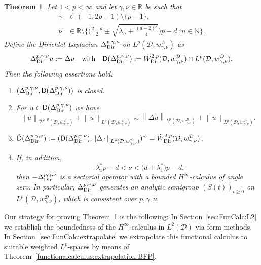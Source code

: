\documentclass[12pt,a4paper, reqno]{amsart}
\theoremstyle{plain}
\newtheorem{theorem}{Theorem}[section]
\theoremstyle{definition}
\theoremstyle{remark}
\numberwithin{equation}{section}
\newcommand{\1}{\mathbbm{1}}
\newcommand{\R}{\ensuremath{\mathbb{R}}}
\newcommand{\N}{\ensuremath{\mathbb{N}}}
\newcommand{\calD}{\ensuremath{\mathcal{D}}}
\newcommand{\sfD}{\ensuremath{\mathsf{D}}}
\newcommand{\Dir}{\textup{Dir}}
\newcommand{\nrm}[1]{\left\lVert #1 \right\rVert}
\begin{document}
\begin{theorem}\label{thm:Laplace:inhom}
Let  $1<p<\infty$ and let $\gamma,\nu\in\R$ be such that
\begin{equation}\label{eq:range:gamma-nu}\begin{aligned}
     \gamma&\in (-1,2p-1)\setminus\{p-1\},\\ \nu&\in\R\setminus\Big\{\Big(\tfrac{2+d}{2}\pm\sqrt{\lambda_n+\tfrac{(d-2)^2}{4}}\Big)p-d\,\colon n\in\N  \Big\}.
\end{aligned}
\end{equation}
Define the Dirichlet Laplacian $\Delta_\Dir^{p,\gamma,\nu}$ on $L^p(\calD,w_{\gamma,\nu}^\calD)$ as 
\[\Delta_\Dir^{p,\gamma,\nu}u:=\Delta u \quad \text{with}\quad \sfD(\Delta_\Dir^{p,\gamma,\nu}):=\Dot W^{2,p}_\Dir(\calD,w_{\gamma,\nu}^\calD)\cap L^p(\calD,w_{\gamma,\nu}^\calD).   \]
Then the following assertions hold.
\begin{enumerate}[\textup{(\roman*)}]
\item\label{it:Laplace:inhom:closed} $(\Delta_\Dir^{p,\gamma,\nu},\sfD(\Delta_\Dir^{p,\gamma,\nu}))$ is closed.
\item\label{it:Laplace:inhom:equivnrms} 
For $u\in \sfD(\Delta_\Dir^{p,\gamma,\nu})$ we have 
\[
\nrm{u}_{\Dot{W}^{2,p}(\calD,w_{\gamma,\nu}^\calD)}
+
\nrm{u}_{L^p(\calD,w_{\gamma,\nu}^\calD)}
\eqsim
\nrm{\Delta u}_{L^p(\calD,w_{\gamma,\nu}^\calD)} + \nrm{u}_{L^p(\calD,w_{\gamma,\nu}^\calD)}.
\]
\item\label{it:Laplace:hom:domain}  $\Dot{\sfD}(\Delta_\Dir^{p,\gamma,\nu}) := (\sfD(\Delta_\Dir^{p,\gamma,\nu}),\nrm{\Delta\,\cdot\,}_{L^p(\calD,w_{\gamma,\nu}^\calD)})^\sim=\Dot{W}^{2,p}_\Dir(\calD,w_{\gamma,\nu}^\calD)$. 
\item\label{it:Laplace:inhom:calculus}  If, in addition,
\begin{equation}\label{eq:range:calc:nu}
-\lambda_1^*p-d<\nu<\big(d+\lambda_1^*\big)p-d,    
\end{equation}
then $-\Delta_\Dir^{p,\gamma,\nu}$ is a sectorial operator with a bounded $H^\infty$-calculus of angle zero.
 In particular, $\Delta_\Dir^{p,\gamma,\nu}$ generates an analytic semigroup $(S(t))_{t\geq 0}$ on $L^p(\calD,w_{\gamma,\nu}^\calD)$, which is consistent over $p,\gamma,\nu$.
\end{enumerate}
\end{theorem}
Our strategy for proving Theorem~\ref{thm:Laplace:inhom} is the following: In Section~\ref{sec:FunCalc:L2} we establish the boundedness of the $H^\infty$-calculus in $L^2(\calD)$ via form methods. In Section~\ref{sec:FunCalc:extrapolate} we extrapolate this functional calculus to suitable weighted $L^p$-spaces by means of Theorem~\ref{functionalcalculus:extrapolation:BFP}.
\end{document}
